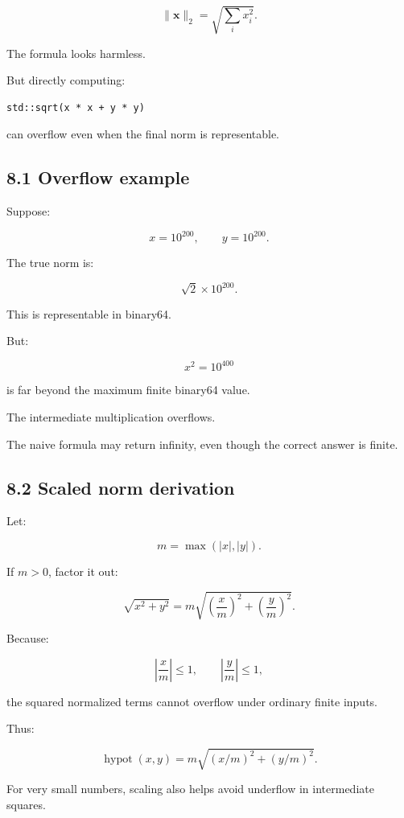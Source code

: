 \[ \boxed{ \|\mathbf x\|_2= \sqrt{\sum_ix_i^2} }. \]

The formula looks harmless.

But directly computing:

\begin{verbatim}
std::sqrt(x * x + y * y)
\end{verbatim}

can overflow even when the final norm is representable.

\subsection{8.1 Overflow example}\label{02-foundations-ii-ch028-overflow-example}

Suppose:

\[ x=10^{200},\qquad y=10^{200}. \]

The true norm is:

\[ \sqrt{2}\times10^{200}. \]

This is representable in binary64.

But:

\[ x^2=10^{400} \]

is far beyond the maximum finite binary64 value.

The intermediate multiplication overflows.

The naive formula may return infinity, even though the correct answer is finite.

\subsection{8.2 Scaled norm derivation}\label{02-foundations-ii-ch028-scaled-norm-derivation}

Let:

\[ m=\max(|x|,|y|). \]

If \(m>0\), factor it out:

\[ \sqrt{x^2+y^2} = m\sqrt{\left(\frac xm\right)^2+\left(\frac ym\right)^2}. \]

Because:

\[ \left|\frac xm\right|\le1, \qquad \left|\frac ym\right|\le1, \]

the squared normalized terms cannot overflow under ordinary finite inputs.

Thus:

\[ \boxed{ \operatorname{hypot}(x,y) = m\sqrt{ (x/m)^2+(y/m)^2 } }. \]

For very small numbers, scaling also helps avoid underflow in intermediate squares.

